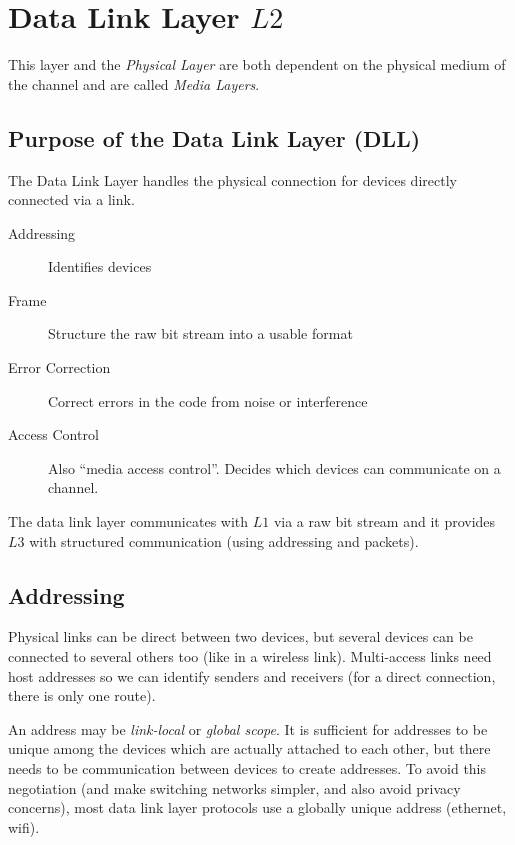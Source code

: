 \section{Data Link Layer \(L2\)}\label{sec:data_link_layer_mk}

This layer and the \emph{Physical Layer} are both dependent on the physical medium of the channel and are called \emph{Media Layers}.

\subsection{Purpose of the Data Link Layer (DLL)}\label{sub:purpose_of_the_data_link_layer_dll_}

The Data Link Layer handles the physical connection for devices directly connected via a link.
\begin{description}
	\item[Addressing] Identifies devices
	\item[Frame] Structure the raw bit stream into a usable format
	\item[Error Correction] Correct errors in the code from noise or interference
	\item[Access Control] Also ``media access control''.
	      Decides which devices can communicate on a channel.
\end{description}
The data link layer communicates with \(L1\) via a raw bit stream and it provides \(L3\) with structured communication (using addressing and packets).

\subsection{Addressing}\label{sub:addressing}

Physical links can be direct between two devices, but several devices can be connected to several others too (like in a wireless link).
Multi-access links need host addresses so we can identify senders and receivers (for a direct connection, there is only one route).

An address may be \emph{link-local} or \emph{global scope}.
It is sufficient for addresses to be unique among the devices which are actually attached to each other, but there needs to be communication between devices to create addresses.
To avoid this negotiation (and make switching networks simpler, and also avoid privacy concerns), most data link layer protocols use a globally unique address (ethernet, wifi).

